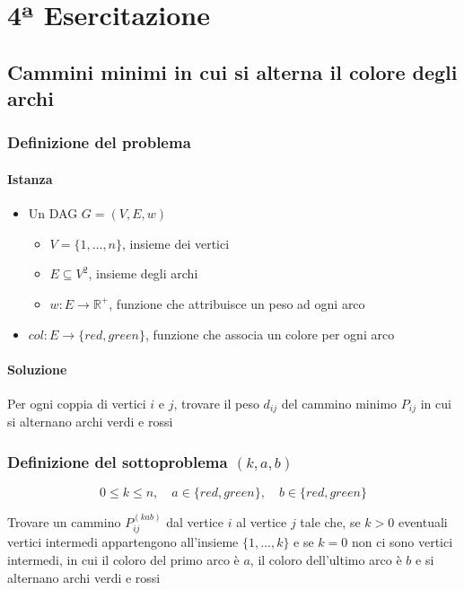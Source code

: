 \chapter{4ª Esercitazione}

\section{Cammini minimi in cui si alterna il colore degli archi}

\subsection{Definizione del problema}

\subsubsection{Istanza}
\begin{itemize}
    \item Un DAG $G=(V,E,w)$
    \begin{itemize}
        \item $V = \{1,\dots,n\}$, insieme dei vertici
        \item $E \subseteq V^2$, insieme degli archi
        \item $w:E \to \mathbb{R}^+$, funzione che attribuisce un peso ad ogni arco
    \end{itemize}
    \item $col:E \to \{red, green\}$, funzione che associa un colore per ogni arco
\end{itemize}

\subsubsection{Soluzione}
Per ogni coppia di vertici $i$ e $j$, trovare il peso $d_{ij}$ del cammino minimo $P_{ij}$ in cui si alternano archi verdi e rossi

\subsection{Definizione del sottoproblema $(k,a,b)$}
{
    \large
    $$
        0 \leq k \leq n, \quad a \in \{red, green\}, \quad b \in \{red, green\}
    $$
}

Trovare un cammino $P_{ij}^{(kab)}$ dal vertice $i$ al vertice $j$ tale che, se $k>0$ eventuali vertici intermedi appartengono all'insieme $\{1,\dots,k\}$ e se $k=0$ non ci sono vertici intermedi, in cui il coloro del primo arco è $a$, il coloro dell'ultimo arco è $b$ e si alternano archi verdi e rossi

